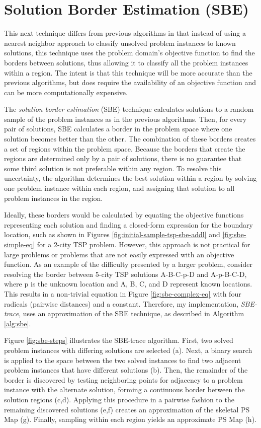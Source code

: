 \section{Solution Border Estimation (SBE)}

This next technique differs from previous algorithms in that instead of using a nearest neighbor approach to classify unsolved problem instances to known solutions, this technique uses the problem domain's objective function to find the borders between solutions, thus allowing it to classify all the problem instances within a region.  The intent is that this technique will be more accurate than the previous algorithms, but does require the availability of an objective function and can be more computationally expensive.

The \textit{solution border estimation} (SBE) technique calculates solutions to a random sample of the problem instances as in the previous algorithms.  Then, for every pair of solutions, SBE calculates a border in the problem space where one solution becomes better than the other.  The combination of these borders creates a set of regions within the problem space.  Because the borders that create the regions are determined only by a pair of solutions, there is no guarantee that some third solution is not preferable within any region.  To resolve this uncertainty, the algorithm determines the best solution within a region by solving one problem instance within each region, and assigning that solution to all problem instances in the region.  

Ideally, these borders would be calculated by equating the objective functions representing each solution and finding a closed-form expression for the boundary location, such as shown in Figures \ref{fig:initial-sample-tsp-sbe-addl} and \ref{fig:sbe-simple-eq} for a 2-city TSP problem. However, this approach is not practical for large problems or problems that are not easily expressed with an objective function.  As an example of the difficulty presented by a larger problem, consider resolving the border between 5-city TSP solutions A-B-C-p-D and A-p-B-C-D, where p is the unknown location and A, B, C, and D represent known locations.  This results in a non-trivial equation in Figure \ref{fig:sbe-complex-eq} with four radicals (pairwise distances) and a constant.  Therefore, my implementation, \textit{SBE-trace}, uses an approximation of the SBE technique, as described in Algorithm \ref{alg:sbe}.    

  Figure \ref{fig:sbe-steps} illustrates the SBE-trace algorithm.  First, two solved problem instances with differing solutions are selected (a).  Next, a binary search is applied to the space between the two solved instances to find two adjacent problem instances that have different solutions (b).  Then, the remainder of the border is discovered by testing neighboring points for adjacency to a problem instance with the alternate solution, forming a continuous border between the solution regions (c,d).  Applying this procedure in a pairwise fashion to the remaining discovered solutions (e,f) creates an approximation of the skeletal PS Map (g).  Finally, sampling within each region yields an approximate PS Map (h).




